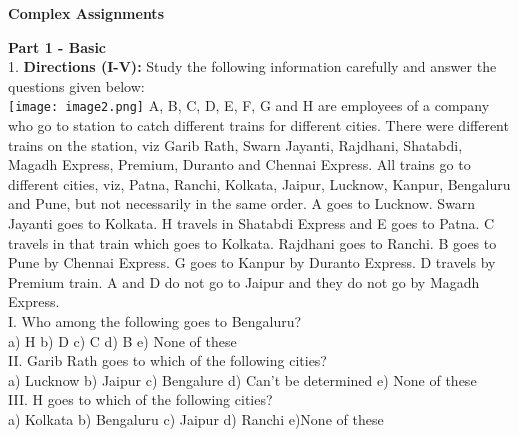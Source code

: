 \documentclass[
]{article}
\author{}
\date{}
\begin{document}
	
 

\begin{center}
	{\Large \textbf{Complex Assignments \\}}
\end{center}

\textbf{Part 1 - Basic}\\

1. \textbf{Directions (I-V):} Study the following information carefully and answer the questions given
below:\\
\texttt{[image: image2.png]}
A, B, C, D, E, F, G and H are employees of a company who go to station to catch different
trains for different cities. There were different trains on the station, viz Garib Rath, Swarn
Jayanti, Rajdhani, Shatabdi, Magadh Express, Premium, Duranto and Chennai Express. All
trains go to different cities, viz, Patna, Ranchi, Kolkata, Jaipur, Lucknow, Kanpur, Bengaluru
and Pune, but not necessarily in the same order.
A goes to Lucknow. Swarn Jayanti goes to Kolkata. H travels in Shatabdi Express and E goes
to Patna. C travels in that train which goes to Kolkata. Rajdhani goes to Ranchi. B goes to
Pune by Chennai Express. G goes to Kanpur by Duranto Express. D travels by Premium
train. A and D do not go to Jaipur and they do not go by Magadh Express.\\

I. Who among the following goes to Bengaluru?\\
a) H \hspace{2mm}b) D \hspace{2mm}c) C \hspace{2mm}d) B \hspace{2mm}e) None of these\\

II. Garib Rath goes to which of the following cities?\\
a) Lucknow \hspace{2mm}b) Jaipur \hspace{2mm}c) Bengalure
\hspace{2mm}d) Can’t be determined \hspace{2mm}e) None of these\\

III. H goes to which of the following cities?\\
a) Kolkata \hspace{2mm}b) Bengaluru \hspace{2mm}c) Jaipur \hspace{2mm}d) Ranchi \hspace{2mm}e)None of these\\
\end{document}
